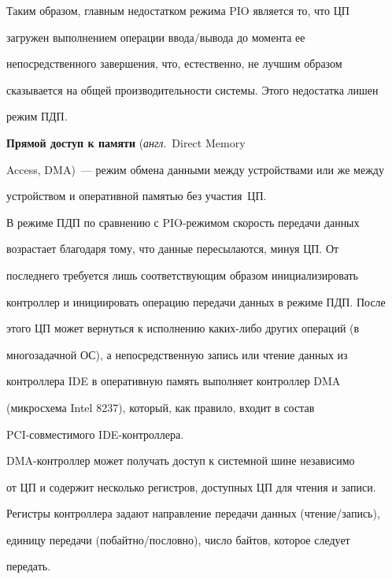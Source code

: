      


     Таким образом, главным недостатком режима PIO является то, что ЦП 


загружен выполнением операции ввода/\!вывода до момента ее 


непосредственного завершения, что, естественно, не лучшим образом 


сказывается на общей производительности системы. Этого недостатка лишен 


режим ПДП.


     


     \textbf{Прямой доступ к памяти} (\textit{англ}.\ Direct Memory 


Access, DMA)~--- режим обмена данными между устройствами или же между 


устройством и оперативной памятью без участия~ЦП.


     


     В режиме ПДП по сравнению с PIO-режимом скорость передачи данных 


возрастает благодаря тому, что данные пересылаются, минуя ЦП. От 


последнего требуется лишь соответствующим образом инициализировать 


контроллер и инициировать операцию передачи данных в режиме ПДП. После 


этого ЦП может вернуться к исполнению каких-либо других операций (в 


многозадачной ОС), а непосредственную запись или чтение данных из 


контроллера IDE в оперативную память выполняет контроллер DMA 


(микросхема Intel 8237), который, как правило, входит в состав 


     PCI-со\-вмес\-ти\-мо\-го IDE-конт\-рол\-лера.


     


     DMA-контроллер может получать доступ к системной шине независимо 


от ЦП и содержит несколько регистров, доступных ЦП для чтения и записи. 


Регистры контроллера задают направление передачи данных (чтение/запись), 


единицу передачи (побайтно/пословно), число байтов, которое следует 


передать.


